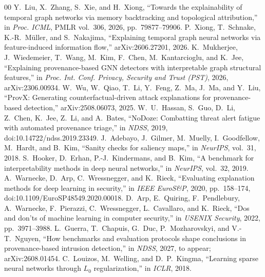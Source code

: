 \documentclass[conference]{IEEEtran}
\begin{document}
\begin{thebibliography}{00}
 Y.~Liu, X.~Zhang, S.~Xie, and H.~Xiong, ``Towards the explainability of temporal graph networks via memory backtracking and topological attribution,'' in \emph{Proc. ICML}, PMLR vol.~306, 2026, pp.~79877--79906.
 P.~Xiong, T.~Schnake, K.-R.~M\"uller, and S.~Nakajima, ``Explaining temporal graph neural networks via feature-induced information flow,'' arXiv:2606.27201, 2026.
 K.~Mukherjee, J.~Wiedemeier, T.~Wang, M.~Kim, F.~Chen, M.~Kantarcioglu, and K.~Jee, ``Explaining provenance-based GNN detectors with interpretable graph structural features,'' in \emph{Proc. Int. Conf. Privacy, Security and Trust (PST)}, 2026, arXiv:2306.00934.
 W.~Wu, W.~Qiao, T.~Li, Y.~Feng, Z.~Ma, J.~Ma, and Y.~Liu, ``ProvX: Generating counterfactual-driven attack explanations for provenance-based detection,'' arXiv:2508.06073, 2025.
 W.~U.~Hassan, S.~Guo, D.~Li, Z.~Chen, K.~Jee, Z.~Li, and A.~Bates, ``NoDoze: Combatting threat alert fatigue with automated provenance triage,'' in \emph{NDSS}, 2019, doi:10.14722/ndss.2019.23349.
 J.~Adebayo, J.~Gilmer, M.~Muelly, I.~Goodfellow, M.~Hardt, and B.~Kim, ``Sanity checks for saliency maps,'' in \emph{NeurIPS}, vol.~31, 2018.
 S.~Hooker, D.~Erhan, P.-J.~Kindermans, and B.~Kim, ``A benchmark for interpretability methods in deep neural networks,'' in \emph{NeurIPS}, vol.~32, 2019.
 A.~Warnecke, D.~Arp, C.~Wressnegger, and K.~Rieck, ``Evaluating explanation methods for deep learning in security,'' in \emph{IEEE EuroS\&P}, 2020, pp.~158--174, doi:10.1109/EuroSP48549.2020.00018.
 D.~Arp, E.~Quiring, F.~Pendlebury, A.~Warnecke, F.~Pierazzi, C.~Wressnegger, L.~Cavallaro, and K.~Rieck, ``Dos and don'ts of machine learning in computer security,'' in \emph{USENIX Security}, 2022, pp.~3971--3988.
 L.~Guerra, T.~Chapuis, G.~Duc, P.~Mozharovskyi, and V.-T.~Nguyen, ``How benchmarks and evaluation protocols shape conclusions in provenance-based intrusion detection,'' in \emph{NDSS}, 2027, to appear; arXiv:2608.01454.
 C.~Louizos, M.~Welling, and D.~P.~Kingma, ``Learning sparse neural networks through $L_0$ regularization,'' in \emph{ICLR}, 2018.
\end{thebibliography}
\end{document}
